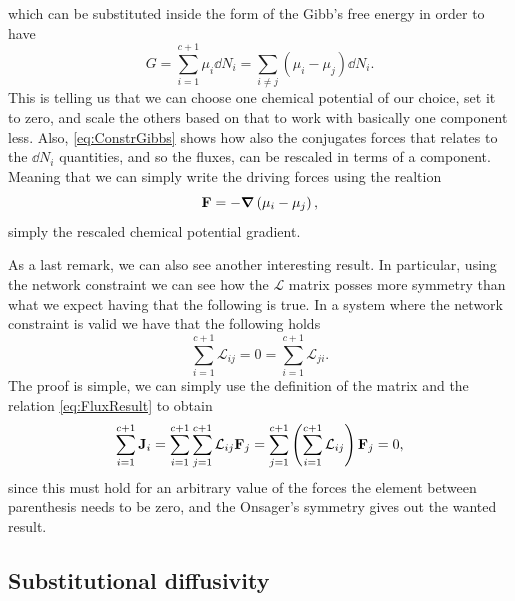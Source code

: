 which can be substituted inside the form of the Gibb's free energy in order to have
\begin{equation}
    \label{eq:ConstrGibbs}
    G = \sum_{i=1}^{c+1}\mu_i \dd N_i = \sum_{i\neq j} \left( \mu_i - \mu_j \right)\dd N_i.
\end{equation}
This is telling us that we can choose one chemical potential of our choice, set it to zero, and scale the others based on that to work with basically one component less. Also, \eqref{eq:ConstrGibbs} shows how also the conjugates forces that relates to the $\dd N_i$ quantities, and so the fluxes, can be rescaled in terms of a component. Meaning that we can simply write the driving forces using the realtion
\begin{equation}
    \vb{F} = - \grad\left( \mu_i - \mu_j \right),
\end{equation}
simply the rescaled chemical potential gradient.

As a last remark, we can also see another interesting result. In particular, using the network constraint we can see how the $\mathcal{L}$ matrix posses more symmetry than what we expect having that the following is true.
{
    In a system where the network constraint is valid we have that the following holds
    \begin{equation}
        \sum_{i=1}^{c+1} \mathcal{L}_{ij} = 0 = \sum_{i=1}^{c+1} \mathcal{L}_{ji}.
    \end{equation}
}
{
    The proof is simple, we can simply use the definition of the matrix and the relation \eqref{eq:FluxResult} to obtain
    \begin{equation}
        \sum_{i=1}^{c+1}\vb{J}_i = \sum_{i=1}^{c+1} \sum_{j=1}^{c+1}\mathcal{L}_{ij}\vb{F}_j = \sum_{j=1}^{c+1} \left( \sum_{i=1}^{c+1}\mathcal{L}_{ij}\right)\vb{F}_j = 0, 
    \end{equation}
    since this must hold for an arbitrary value of the forces the element between parenthesis needs to be zero, and the Onsager's symmetry gives out the wanted result.
}

\subsection{Substitutional diffusivity}

